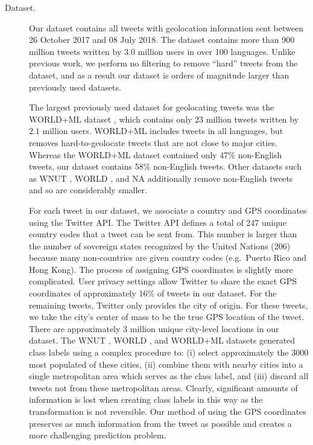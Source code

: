 \documentclass[sigconf,anonymous,review]{acmart}
\renewcommand{\times}{\mathbin{\tikz [x=1.4ex,y=1.4ex,line width=.1ex] \draw (0,0) -- (1,1) (0,1) -- (1,0);}}%
\begin{document}
\begin{description}

\item[Dataset.]
Our dataset contains all tweets with geolocation information sent between 26 October 2017 and 08 July 2018.
The dataset contains more than 900 million tweets written by $3.0$ million users in over 100 languages.
Unlike previous work, 
we perform no filtering to remove ``hard'' tweets from the dataset,
and as a result our dataset is orders of magnitude larger than previously used datasets.

The largest previously used dataset for geolocating tweets was the WORLD+ML dataset \citep{han2014text},
which contains only $23$ million tweets written by $2.1$ million users.
WORLD+ML includes tweets in all languages,
but removes hard-to-geolocate tweets that are not close to major cities.
Whereas the WORLD+ML dataset contained only 47\% non-English tweets,
our dataset contains 58\% non-English tweets.
Other datasets such as WNUT \citep{han2016twitter}, WORLD \citep{han2012geolocation}, and NA \citep{roller2012supervised}
additionally remove non-English tweets and so are considerably smaller.

For each tweet in our dataset, we associate a country and GPS coordinates using the Twitter API.
The Twitter API defines a total of 247 unique country codes that a tweet can be sent from.
This number is larger than the number of sovereign states recognized by the United Nations (206)
because many non-countries are given country codes (e.g.\ Puerto Rico and Hong Kong).
The process of assigning GPS coordinates is slightly more complicated.
User privacy settings allow Twitter to share the exact GPS coordinates of approximately 16\% of tweets in our dataset.
For the remaining tweets, Twitter only provides the city of origin.
For these tweets, we take the city's center of mass to be the true GPS location of the tweet.
There are approximately 3 million unique city-level locations in our dataset.
The WNUT \citep{han2016twitter}, WORLD \citep{han2012geolocation}, and WORLD+ML \citep{han2014text} datasets generated class labels using a complex procedure to:
(i) select approximately the 3000 most populated of these cities,
(ii) combine them with nearby cities into a single metropolitan area which serves as the class label,
and (iii) discard all tweets not from these metropolitan areas.
Clearly, significant amounts of information is lost when creating class labels in this way as the transformation is not reversible.
Our method of using the GPS coordinates preserves as much information from the tweet as possible and creates a more challenging prediction problem.


\end{description}
\end{document}
